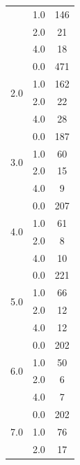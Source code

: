 \begin{longtable}{|c|c|c|c|c|}
& \multicolumn{2}{c|}{1.0} & \multicolumn{2}{c|}{146} \\
& \multicolumn{2}{c|}{2.0} & \multicolumn{2}{c|}{21} \\
& \multicolumn{2}{c|}{4.0} & \multicolumn{2}{c|}{18} \\
\hline
\multirow{4}{*}{2.0} & \multicolumn{2}{c|}{0.0} & \multicolumn{2}{c|}{471} \\
& \multicolumn{2}{c|}{1.0} & \multicolumn{2}{c|}{162} \\
& \multicolumn{2}{c|}{2.0} & \multicolumn{2}{c|}{22} \\
& \multicolumn{2}{c|}{4.0} & \multicolumn{2}{c|}{28} \\
\hline
\multirow{4}{*}{3.0} & \multicolumn{2}{c|}{0.0} & \multicolumn{2}{c|}{187} \\
& \multicolumn{2}{c|}{1.0} & \multicolumn{2}{c|}{60} \\
& \multicolumn{2}{c|}{2.0} & \multicolumn{2}{c|}{15} \\
& \multicolumn{2}{c|}{4.0} & \multicolumn{2}{c|}{9} \\
\hline
\multirow{4}{*}{4.0} & \multicolumn{2}{c|}{0.0} & \multicolumn{2}{c|}{207} \\
& \multicolumn{2}{c|}{1.0} & \multicolumn{2}{c|}{61} \\
& \multicolumn{2}{c|}{2.0} & \multicolumn{2}{c|}{8} \\
& \multicolumn{2}{c|}{4.0} & \multicolumn{2}{c|}{10} \\
\hline
\multirow{4}{*}{5.0} & \multicolumn{2}{c|}{0.0} & \multicolumn{2}{c|}{221} \\
& \multicolumn{2}{c|}{1.0} & \multicolumn{2}{c|}{66} \\
& \multicolumn{2}{c|}{2.0} & \multicolumn{2}{c|}{12} \\
& \multicolumn{2}{c|}{4.0} & \multicolumn{2}{c|}{12} \\
\hline
\multirow{4}{*}{6.0} & \multicolumn{2}{c|}{0.0} & \multicolumn{2}{c|}{202} \\
& \multicolumn{2}{c|}{1.0} & \multicolumn{2}{c|}{50} \\
& \multicolumn{2}{c|}{2.0} & \multicolumn{2}{c|}{6} \\
& \multicolumn{2}{c|}{4.0} & \multicolumn{2}{c|}{7} \\
\hline
\multirow{4}{*}{7.0} & \multicolumn{2}{c|}{0.0} & \multicolumn{2}{c|}{202} \\
& \multicolumn{2}{c|}{1.0} & \multicolumn{2}{c|}{76} \\
& \multicolumn{2}{c|}{2.0} & \multicolumn{2}{c|}{17} \\

\end{longtable}
